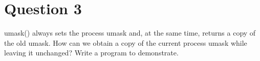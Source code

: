 \documentclass[main.tex]{subfiles}
\begin{document}
\section{Question 3}

umask() always sets the process umask and, at the same time, returns a copy of
the old umask. How can we obtain a copy of the current process umask while
leaving it unchanged? Write a program to demonstrate.



\end{document}
